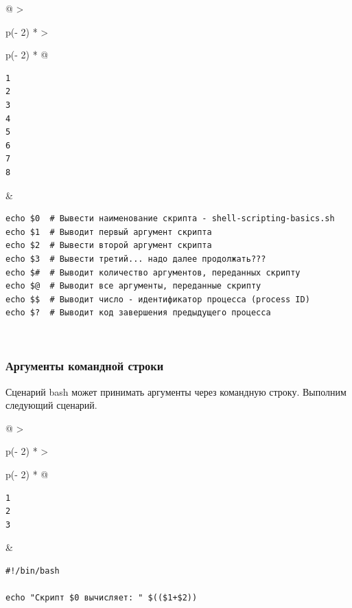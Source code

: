 \documentclass{report}
\begin{document}
\begin{longtable}[]{@{}
  >{\raggedright\arraybackslash}p{(\columnwidth - 2\tabcolsep) * }
  >{\raggedright\arraybackslash}p{(\columnwidth - 2\tabcolsep) * }@{}}
\toprule
\endhead
\begin{minipage}[t]{\linewidth}\raggedright
\begin{verbatim}
1
2
3
4
5
6
7
8
\end{verbatim}
\end{minipage} & \begin{minipage}[t]{\linewidth}\raggedright
\begin{verbatim}
echo $0  # Вывести наименование скрипта - shell-scripting-basics.sh
echo $1  # Выводит первый аргумент скрипта
echo $2  # Вывести второй аргумент скрипта
echo $3  # Вывести третий... надо далее продолжать???
echo $#  # Выводит количество аргументов, переданных скрипту
echo $@  # Выводит все аргументы, переданные скрипту
echo $$  # Выводит число - идентификатор процесса (process ID)
echo $?  # Выводит код завершения предыдущего процесса
\end{verbatim}
\end{minipage} \\ \addlinespace
\bottomrule
\end{longtable}

\hypertarget{Command-Line-Arguments}{%
\subsubsection{\texorpdfstring{\protect\hyperlink{Command-Line-Arguments}{}Аргументы
командной
строки}{Аргументы командной строки}}\label{Command-Line-Arguments}}

Сценарий bash может принимать аргументы через командную строку. Выполним
следующий сценарий.

\begin{longtable}[]{@{}
  >{\raggedright\arraybackslash}p{(\columnwidth - 2\tabcolsep) * }
  >{\raggedright\arraybackslash}p{(\columnwidth - 2\tabcolsep) * }@{}}
\toprule
\endhead
\begin{minipage}[t]{\linewidth}\raggedright
\begin{verbatim}
1
2
3
\end{verbatim}
\end{minipage} & \begin{minipage}[t]{\linewidth}\raggedright
\begin{verbatim}
#!/bin/bash

echo "Скрипт $0 вычисляет: " $(($1+$2))
\end{verbatim}
\end{minipage} \\ \addlinespace
\bottomrule
\end{longtable}
\end{document}
